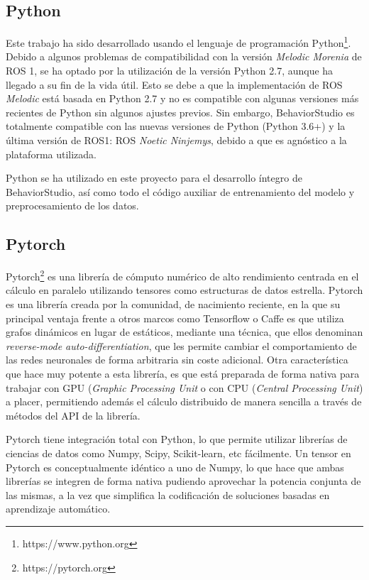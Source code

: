 \subsection{Python}

Este trabajo ha sido desarrollado usando el lenguaje de programación Python\footnote{https://www.python.org}. Debido a algunos problemas de compatibilidad con la versión \textit{Melodic Morenia} de ROS 1, se ha optado por la utilización de la versión Python 2.7, aunque ha llegado a su fin de la vida útil. Esto se debe a que la implementación de ROS \textit{Melodic} está basada en Python 2.7 y no es compatible con algunas versiones más recientes de Python sin algunos ajustes previos. Sin embargo, BehaviorStudio es totalmente compatible con las nuevas versiones de Python (Python 3.6+) y la última versión de ROS1: ROS \textit{Noetic Ninjemys}, debido a que es agnóstico a la plataforma utilizada. 

Python se ha utilizado en este proyecto para el desarrollo íntegro de BehaviorStudio, así como todo el código auxiliar de entrenamiento del modelo y preprocesamiento de los datos.

\subsection{Pytorch}

Pytorch\footnote{https://pytorch.org} es una librería de cómputo numérico de alto rendimiento centrada en el cálculo en paralelo utilizando tensores como estructuras de datos estrella. Pytorch es una librería creada por la comunidad, de nacimiento reciente, en la que su principal ventaja frente a otros marcos como Tensorflow o Caffe es que utiliza grafos dinámicos en lugar de estáticos, mediante una técnica, que ellos denominan \textit{reverse-mode auto-differentiation}, que les permite cambiar el comportamiento de las redes neuronales de forma arbitraria sin coste adicional. Otra característica que hace muy potente a esta librería, es que está preparada de forma nativa para trabajar con GPU (\textit{Graphic Processing Unit} o con CPU (\textit{Central Processing Unit}) a placer, permitiendo además el cálculo distribuido de manera sencilla a través de métodos del API de la librería.

Pytorch tiene integración total con Python, lo que permite utilizar librerías de ciencias de datos como Numpy, Scipy, Scikit-learn, etc fácilmente. Un tensor en Pytorch es conceptualmente idéntico a uno de Numpy, lo que hace que ambas librerías se integren de forma nativa pudiendo aprovechar la potencia conjunta de las mismas, a la vez que simplifica la codificación de soluciones basadas en aprendizaje automático.

